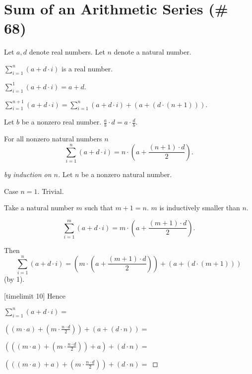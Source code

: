 \documentclass{article}
\begin{document}
\section{Sum of an Arithmetic Series (\# 68)}

\newcommand{\sumarith}[3]{\sum_{i = 1}^{#3}(#1 + #2 \cdot i)}

\begin{forthel}
Let $a,d$ denote real numbers.
Let $n$ denote a natural number.

\begin{signature}
$\sumarith{a}{d}{n}$ is a real number.
\end{signature}

\begin{axiom}
$\sumarith{a}{d}{1} = a + d$.
\end{axiom}

\begin{axiom}[1]
$\sumarith{a}{d}{n+1} = \sumarith{a}{d}{n} + (a + (d \cdot (n + 1)))$.
\end{axiom}

\begin{lemma}
Let $b$ be a nonzero real number.
$\frac{a}{b} \cdot d = a \cdot \frac{d}{b}$.
\end{lemma}

\begin{theorem} For all nonzero natural numbers $n$
$$\sumarith{a}{d}{n} = n \cdot ( a + \frac{(n + 1) \cdot d}{2}).$$
\end{theorem}
\begin{proof}[by induction on $n$]
Let $n$ be a nonzero natural number.

Case $n = 1$.
Trivial.

Take a natural number $m$ such that $m + 1 = n$. $m$ is inductively smaller than $n$.

$$\sumarith{a}{d}{m} = m \cdot ( a + \frac{(m + 1) \cdot d}{2}).$$

Then
$$\sumarith{a}{d}{n} = 
(m \cdot ( a + \frac{(m + 1) \cdot d}{2})) + (a + (d \cdot (m + 1)))$$
(by 1).


[timelimit 10]
Hence

$\sumarith{a}{d}{n} =$

$((m \cdot a) + (m \cdot \frac{n \cdot d}{2})) + (a + (d \cdot n)) =$

$(((m \cdot a) + (m \cdot \frac{n \cdot d}{2})) + a) + (d \cdot n) =$

$(((m \cdot a) + a) +  (m \cdot \frac{n \cdot d}{2})) + (d \cdot n) =$


\end{proof}
\end{forthel}
\end{document}
